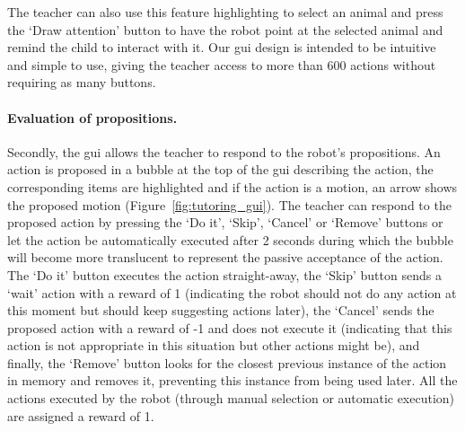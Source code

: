 The teacher can also use this feature highlighting to select an animal and press the `Draw attention' button to have the robot point at the selected animal and remind the child to interact with it.
Our \gls{gui} design is intended to be intuitive and simple to use, giving the teacher access to more than 600 actions without requiring as many buttons. %

\paragraph{Evaluation of propositions.} Secondly, the \gls{gui} allows the teacher to respond to the robot's propositions. An action is proposed in a bubble at the top of the \gls{gui} describing the action, the corresponding items are highlighted and if the action is a motion, an arrow shows the proposed motion (Figure~\ref{fig:tutoring_gui}). The teacher can respond to the proposed action by pressing the `Do it', `Skip', `Cancel' or `Remove' buttons or let the action be automatically executed after 2 seconds during which the bubble will become more translucent to represent the passive acceptance of the action. The `Do it' button executes the action straight-away, the `Skip' button sends a `wait' action with a reward of 1 (indicating the robot should not do any action at this moment but should keep suggesting actions later), the `Cancel' sends the proposed action with a reward of -1 and does not execute it (indicating that this action is not appropriate in this situation but other actions might be), and finally, the `Remove' button looks for the closest previous instance of the action in memory and removes it, preventing this instance from being used later. %
All the actions executed by the robot (through manual selection or automatic execution) are assigned a reward of 1. 


